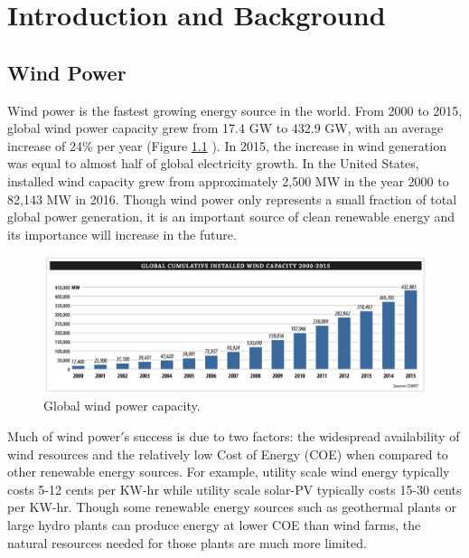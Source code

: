 
\chapter{Introduction and Background} %

\label{Chapter1} %



\section{Wind Power}

Wind power is the fastest growing energy source in the world.  From 2000 to 2015, global wind power capacity grew from 17.4 GW to 432.9 GW, with an average increase of 24\% per year (Figure \ref{fig1-1} ). In 2015, the increase in wind generation was equal to almost half of global electricity growth.\cite{sawyer2015} In the United States, installed wind capacity grew from approximately 2,500 MW in the year 2000 to 82,143 MW in 2016.\cite{williams2016} Though wind power only represents a small fraction of total global power generation, it is an important source of clean renewable energy and its importance will increase in the future.

\begin{figure}[htbp]
	\centering
		\includegraphics[width=\linewidth]{Figures/ch1Figures/fig1-1.png}
	\caption{Global wind power capacity.\cite{sawyer2015}}
	\label{fig1-1}
\end{figure}

Much of wind power$'$s success is due to two factors: the widespread availability of wind resources and the relatively low Cost of Energy (COE) when compared to other renewable energy sources.  For example, utility scale wind energy typically costs 5-12 cents per KW-hr while utility scale solar-PV typically costs 15-30 cents per KW-hr.\cite{ren212011} Though some renewable energy sources such as geothermal plants or large hydro plants can produce energy at lower COE than wind farms, the natural resources needed for those plants are much more limited.  

